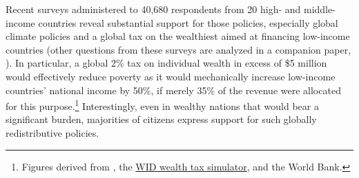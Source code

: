 Recent surveys administered to 40,680 respondents from 20 high- and middle-income countries reveal substantial support for those policies, especially global climate policies and a global tax on the wealthiest aimed at financing low-income countries (other questions from these surveys are analyzed in a companion paper, \citealp{dechezlepretre_fighting_2022}). In particular, a global 2\% tax on individual wealth in excess of \$5 million would effectively reduce poverty as it would mechanically increase low-income countries' national income by 50\%, if merely 35\% of the revenue were allocated for this purpose.\footnote{Figures derived from \citet{chancel_world_2022}, the \href{https://wid.world/world-wealth-tax-simulator/}{WID wealth tax simulator}, and the World Bank.} Interestingly, even in wealthy nations that would bear a significant burden, majorities of citizens express support for such globally redistributive policies.%


